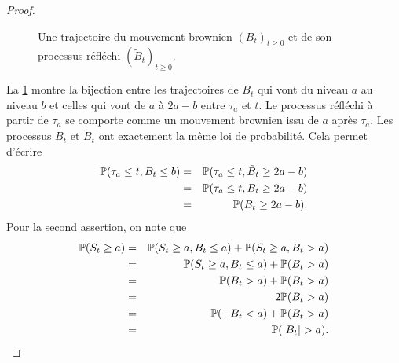 \begin{proof}
\begin{figure}[!h]
\begin{center}
\end{center}
\caption{Une trajectoire du mouvement brownien $(B_t)_{t\geq 0}$ et de son processus réfléchi $(\tilde{B}_t)_{t\geq0}$.}
\label{fig:trajectory_reflected_bm}
\end{figure}
La \cref{fig:trajectory_reflected_bm} montre la bijection entre les trajectoires de $B_t$ qui vont du niveau $a$ au niveau $b$ et celles qui vont de $a$ à $2a - b$ entre $\tau_a$ et $t$. Le processus réfléchi à partir de $\tau_a$ se comporte comme un mouvement brownien issu de $a$ après $\tau_a$. Les processus $B_t$ et $\tilde{B}_t$ ont exactement la même loi de probabilité. Cela permet d'écrire
\begin{eqnarray*}
\mathbb{P}(\tau_a\leq t, B_t \leq  b)&=&\mathbb{P}(\tau_a\leq t, \tilde{B}_t \geq  2a-b)\\
&=&\mathbb{P}(\tau_a\leq t, B_t \geq  2a-b)\\
&=&\mathbb{P}( B_t \geq  2a-b).
\end{eqnarray*}
Pour la second assertion, on note que 
\begin{eqnarray*}
\mathbb{P}(S_t \geq a ) &=&\mathbb{P}(S_t \geq a, B_t \leq a ) + \mathbb{P}(S_t \geq a, B_t > a )\\
&=&\mathbb{P}(S_t \geq a, B_t \leq a ) + \mathbb{P}( B_t > a )\\
&=&\mathbb{P}( B_t > a ) +  \mathbb{P}( B_t > a )\\
&=&2\mathbb{P}( B_t > a )\\
&=&\mathbb{P}( -B_t < a ) + \mathbb{P}( B_t > a )\\
&=&\mathbb{P}( |B_t| > a ).
\end{eqnarray*}
\end{proof}

